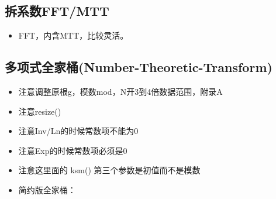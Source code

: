 
\subsection{拆系数FFT/MTT}
\begin{itemize}
    \item FFT，内含MTT，比较灵活。
\end{itemize} 


\subsection{多项式全家桶(Number-Theoretic-Transform)}
\begin{itemize}
    \item 注意调整原根g，模数mod，N开3到4倍数据范围，附录A
    \item 注意resize()
    \item 注意Inv/Ln的时候常数项不能为0
    \item 注意Exp的时候常数项必须是0
    \item 注意这里面的 ksm() 第三个参数是初值而不是模数
\end{itemize}


\begin{itemize}
    \item 简约版全家桶：
\end{itemize}


